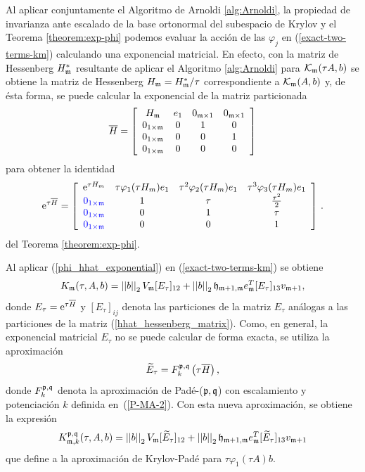 Al aplicar conjuntamente el Algoritmo de Arnoldi \ref{alg:Arnoldi}, la propiedad de invarianza ante escalado de la base ortonormal del subespacio de Krylov y el Teorema \ref{theorem:exp-phi} podemos evaluar la acción de las $\varphi_j$ en (\ref{exact-two-terms-km}) calculando una exponencial matricial. En efecto, con la matriz de Hessenberg $H^*_{\mathfrak{m}}$ resultante de aplicar el Algoritmo \ref{alg:Arnoldi} para $\mathcal{K}_{\mathfrak{m}}(\tau A,b)$ se obtiene la matriz de Hessenberg $H_{\mathfrak{m}}=H^*_{\mathfrak{m}}/\tau$ correspondiente a $\mathcal{K}_{\mathfrak{m}}(A,b)$ y, de ésta forma, se puede calcular la exponencial de la matriz particionada
\begin{equation}
    \overline{H} = \left[\begin{array}{cccc}
    H_{\mathfrak{m}} & e_1 & 0_{\mathfrak{m}\times 1} & 0_{\mathfrak{m}\times 1}\\
    0_{1\times\mathfrak{m}} & 0 & 1 & 0\\
    0_{1\times\mathfrak{m}} & 0 & 0 & 1\\
    0_{1\times\mathfrak{m}} & 0 & 0 & 0
    \end{array}\right] \label{hhat_hessenberg_matrix}
    \end{equation}
para obtener la identidad
\begin{equation}
    \mathrm{e}^{\tau\overline{H}} = \left[\begin{array}{cccc}
    \mathrm{e}^{\tau H_m} & \tau\varphi_1(\tau H_m)e_1 & \tau^{2}\varphi_2(\tau H_m)e_1 &
    \tau^{3}\varphi_3(\tau H_m)e_1 \\
    \textcolor{blue}{0_{1\times\mathfrak{m}}} & 1 & \tau & \frac{\tau^{2}}{2}\\
    \textcolor{blue}{0_{1\times\mathfrak{m}}} & 0 & 1 & \tau \\
    \textcolor{blue}{0_{1\times\mathfrak{m}}} & 0 & 0 & 1 \\
    \end{array}\right] \,. \label{phi_hhat_exponential}
\end{equation}
del Teorema \ref{theorem:exp-phi}.

Al aplicar (\ref{phi_hhat_exponential}) en (\ref{exact-two-terms-km}) se obtiene
\begin{equation*}
    K_{\mathfrak{m}}(\tau,A,b) = \left\lvert \left\lvert  b  \right\rvert \right\rvert_2V_{\mathfrak{m}} [E_\tau]_{12} + \left\lvert \left\lvert  b  \right\rvert \right\rvert_2\mathfrak{h}_{\mathfrak{m}+1,\mathfrak{m}}e^T_{\mathfrak{m}}[E_\tau]_{13}v_{\mathfrak{m}+1}, 
 \end{equation*}
 donde $E_\tau = \mathrm{e}^{\tau \overline{H} }$ y $[E_\tau]_{ij}$ denota las particiones de la matriz $E_\tau$ análogas a las particiones de la matriz (\ref{hhat_hessenberg_matrix}). Como, en general, la exponencial matricial $E_\tau$ no se puede calcular de forma exacta, se utiliza la aproximación
\begin{equation*}
    \widetilde{E}_{\tau} = F_k^{\mathfrak{p},\mathfrak{q}}\left(\tau\overline{H}\right),
\end{equation*}
donde $F_k^{\mathfrak{p},\mathfrak{q}}$ denota la aproximación de Padé-($\mathfrak{p},\mathfrak{q}$) con escalamiento y potenciación $k$ definida en~(\ref{P-MA-2}). Con esta nueva aproximación, se obtiene la expresión 
\begin{equation} \label{eq:kp_aprox}
    K_{\mathfrak{m},k}^{\mathfrak{p},\mathfrak{q}}(\tau,A,b) = \left\lvert \left\lvert  b  \right\rvert \right\rvert_2V_{\mathfrak{m}} [\widetilde{E}_\tau]_{12} + \left\lvert \left\lvert  b  \right\rvert \right\rvert_2\mathfrak{h}_{\mathfrak{m}+1,\mathfrak{m}}e^T_{\mathfrak{m}}[\widetilde{E}_\tau]_{13}v_{\mathfrak{m}+1}
 \end{equation}
 que define a la aproximación de Krylov-Padé para $\tau\varphi_1(\tau A)b$.

